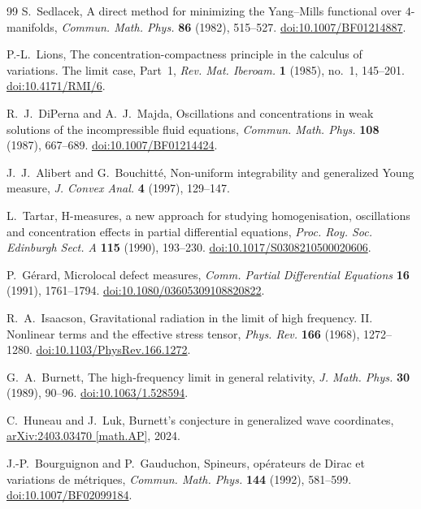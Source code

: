 \documentclass[11pt]{article}
\numberwithin{equation}{section}
\theoremstyle{definition}
\theoremstyle{remark}
\begin{document}
\begin{thebibliography}{99}
S.~Sedlacek,
A direct method for minimizing the Yang--Mills functional over $4$-manifolds,
\emph{Commun. Math. Phys.} \textbf{86} (1982), 515--527.
\href{https://doi.org/10.1007/BF01214887}{doi:10.1007/BF01214887}.

P.-L.~Lions,
The concentration-compactness principle in the calculus of variations.
The limit case, Part~1,
\emph{Rev. Mat. Iberoam.} \textbf{1} (1985), no.~1, 145--201.
\href{https://doi.org/10.4171/RMI/6}{doi:10.4171/RMI/6}.

R.~J.~DiPerna and A.~J.~Majda,
Oscillations and concentrations in weak solutions of the incompressible fluid equations,
\emph{Commun. Math. Phys.} \textbf{108} (1987), 667--689.
\href{https://doi.org/10.1007/BF01214424}{doi:10.1007/BF01214424}.

J.~J.~Alibert and G.~Bouchitt\'e,
Non-uniform integrability and generalized Young measure,
\emph{J. Convex Anal.} \textbf{4} (1997), 129--147.

L.~Tartar,
H-measures, a new approach for studying homogenisation, oscillations and concentration effects in partial differential equations,
\emph{Proc. Roy. Soc. Edinburgh Sect. A} \textbf{115} (1990), 193--230.
\href{https://doi.org/10.1017/S0308210500020606}{doi:10.1017/S0308210500020606}.

P.~G\'erard,
Microlocal defect measures,
\emph{Comm. Partial Differential Equations} \textbf{16} (1991), 1761--1794.
\href{https://doi.org/10.1080/03605309108820822}{doi:10.1080/03605309108820822}.

R.~A.~Isaacson,
Gravitational radiation in the limit of high frequency. II. Nonlinear terms and the effective stress tensor,
\emph{Phys. Rev.} \textbf{166} (1968), 1272--1280.
\href{https://doi.org/10.1103/PhysRev.166.1272}{doi:10.1103/PhysRev.166.1272}.

G.~A.~Burnett,
The high-frequency limit in general relativity,
\emph{J. Math. Phys.} \textbf{30} (1989), 90--96.
\href{https://doi.org/10.1063/1.528594}{doi:10.1063/1.528594}.

C.~Huneau and J.~Luk,
Burnett's conjecture in generalized wave coordinates,
\href{https://arxiv.org/abs/2403.03470}{arXiv:2403.03470 [math.AP]}, 2024.

J.-P.~Bourguignon and P.~Gauduchon,
Spineurs, op\'erateurs de Dirac et variations de m\'etriques,
\emph{Commun. Math. Phys.} \textbf{144} (1992), 581--599.
\href{https://doi.org/10.1007/BF02099184}{doi:10.1007/BF02099184}.


\end{thebibliography}
\end{document}
